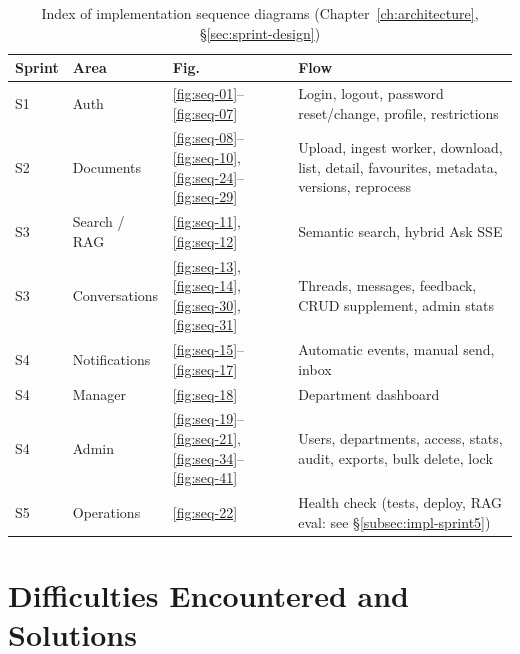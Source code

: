 \begin{table}[H]
\centering
\caption{Index of implementation sequence diagrams (Chapter~\ref{ch:architecture}, \S\ref{sec:sprint-design})}
\label{tab:seq-index}
\scriptsize
\begin{tabularx}{\textwidth}{|>{\Centering\arraybackslash}p{0.8cm}|>{\RaggedRight\arraybackslash}p{2.3cm}|>{\Centering\arraybackslash}p{1.0cm}|Y|}
\hline
\textbf{Sprint} & \textbf{Area} & \textbf{Fig.} & \textbf{Flow} \\
\hline
S1 & Auth & \ref{fig:seq-01}--\ref{fig:seq-07} & Login, logout, password reset/change, profile, restrictions \\
\hline
S2 & Documents & \ref{fig:seq-08}--\ref{fig:seq-10}, \ref{fig:seq-24}--\ref{fig:seq-29} & Upload, ingest worker, download, list, detail, favourites, metadata, versions, reprocess \\
\hline
S3 & Search / RAG & \ref{fig:seq-11}, \ref{fig:seq-12} & Semantic search, hybrid Ask SSE \\
\hline
S3 & Conversations & \ref{fig:seq-13}, \ref{fig:seq-14}, \ref{fig:seq-30}, \ref{fig:seq-31} & Threads, messages, feedback, CRUD supplement, admin stats \\
\hline
S4 & Notifications & \ref{fig:seq-15}--\ref{fig:seq-17} & Automatic events, manual send, inbox \\
\hline
S4 & Manager & \ref{fig:seq-18} & Department dashboard \\
\hline
S4 & Admin & \ref{fig:seq-19}--\ref{fig:seq-21}, \ref{fig:seq-34}--\ref{fig:seq-41} & Users, departments, access, stats, audit, exports, bulk delete, lock \\
\hline
S5 & Operations & \ref{fig:seq-22} & Health check (tests, deploy, RAG eval: see \S\ref{subsec:impl-sprint5}) \\
\hline
\end{tabularx}
\end{table}

\section{Difficulties Encountered and Solutions}

